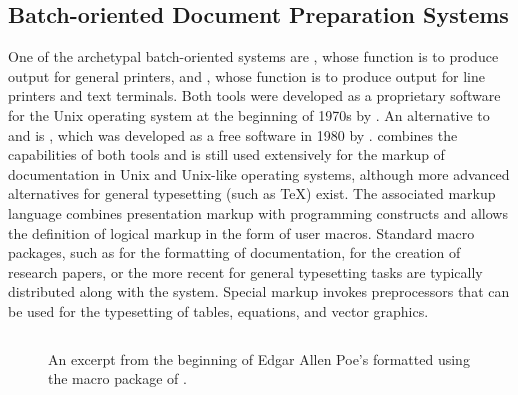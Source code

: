 \documentclass{book}
\begin{document}
\subsection{Batch-oriented Document Preparation Systems}
One of the archetypal batch-oriented systems are , whose
function is to produce output for general printers, and %
, whose function is to
produce output for line printers and text terminals. Both tools were developed
as a proprietary software for the Unix operating system at the beginning of
1970s by . An alternative to  and
 is
, which
was developed as a free software in 1980 by . 
combines the capabilities of both tools and is still used extensively for the
markup of documentation in Unix and Unix-like operating systems, although more
advanced alternatives for general typesetting (such as \TeX) exist. The
associated markup language combines presentation markup with programming
constructs and allows the definition of logical markup in the form of user
macros. Standard macro packages, such as  for the
formatting of documentation, 
 for the creation of research papers,
or the more recent  
for general typesetting tasks are typically distributed along with the system.
Special markup invokes preprocessors that can be used for the typesetting of
tables, equations, and vector graphics.

\begin{figure}
  \inputminted{groff}{examples/02/poe.groff}
  \caption{An excerpt from the beginning of Edgar Allen Poe's  formatted using the 
   macro package of
  .}
  \label{fig:poe}
\end{figure}

\end{document}
